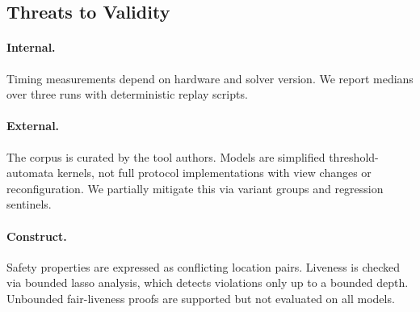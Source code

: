 \subsection{Threats to Validity}

\paragraph{Internal.}
Timing measurements depend on hardware and solver version.  We report
medians over three runs with deterministic replay scripts.

\paragraph{External.}
The corpus is curated by the tool authors.  Models are simplified
threshold-automata kernels, not full protocol implementations with view
changes or reconfiguration.  We partially mitigate this via variant
groups and regression sentinels.

\paragraph{Construct.}
Safety properties are expressed as conflicting location pairs.
Liveness is checked via bounded lasso analysis, which detects
violations only up to a bounded depth.  Unbounded fair-liveness
proofs are supported but not evaluated on all models.

